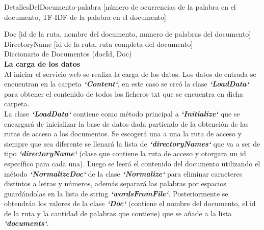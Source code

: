 \documentclass{article}
\begin{document}
\large{DetallesDelDocumento-palabra [número de ocurrencias de la palabra en el documento,
\newline\hspace*{6.2cm} TF-IDF de la palabra en el documento]}\linebreak \\

 \begin{flushleft}
\hspace*{0.5cm}\large{Doc [id de la ruta, nombre del documento, numero de palabras del documento]}\linebreak \\


\hspace*{0.5cm}\large{DirectoryName [id de la ruta, ruta completa del documento]}\linebreak \\


\hspace*{0.5cm}\large{Diccionario de Documentos (docId, Doc)}\linebreak \\


\Large {\textbf{La carga de los datos}}\linebreak \\

\large {Al iniciar el servicio web se realiza la carga de los datos. Los datos de entrada se 
encuentran en la carpeta \textbf{\textit{`Content`}}, en este caso se creó la clase \textbf{\textit{`LoadData`}} para obtener el contenido de todos los ficheros txt que se encuentra en dicha carpeta.\linebreak \\

La clase \textbf{\textit{`LoadData`}} contiene como método principal a \textbf{\textit{`Initialize`}} que se encargará de inicializar la base de datos dada partiendo de la obtención de las rutas de acceso a los 
documentos. Se escogerá una a una la ruta de acceso y siempre que sea diferente se llenará la lista de \textbf{\textit{`directoryNames`}} que va a ser de tipo \textbf{\textit{`directoryName`}} (clase que 
contiene la ruta de acceso y otorgara un id específico para cada una). Luego se leerá el contenido del documento utilizando el método \textbf{\textit{`NormalizeDoc`}} de la clase \textbf{\textit{`Normalize`}} para eliminar caracteres distintos a letras y números, además separará las palabras por espacios guardándolas en la lista de string \textbf{\textit{`wordsFromFile`}}. Posteriormente se obtendrán los valores de la clase \textbf{\textit{`Doc`}} (contiene el nombre del documento, el id de la ruta y la cantidad de palabras que contiene) que se añade a la lista \textbf{\textit{`documents`}}.\linebreak \\

}
\end{flushleft}
\end{document}
